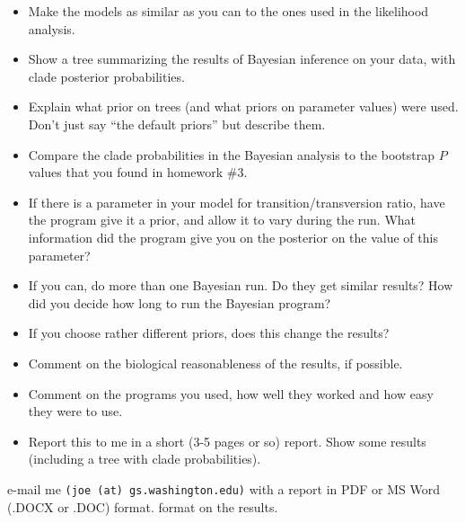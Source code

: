 \documentclass[12pt]{article}
\begin{document}
\begin{itemize}
\item Make the models as similar as you can to the ones used in the
likelihood analysis.
\item Show a tree summarizing the results of Bayesian inference on your
data, with clade posterior probabilities.
\item Explain what prior on trees (and what priors on parameter values)
were used.  Don't just say ``the default priors'' but describe them.
\item Compare the clade probabilities in the Bayesian analysis to the
bootstrap $P$ values that you found in homework \#3.
\item If there is a parameter in your model for transition/transversion
ratio, have the program give it a prior, and allow it to vary during the
run.  What information did the program give you on the posterior on
the value of this parameter?
\item If you can, do more than one Bayesian run.  Do they get similar
results?  How did you decide how long to run the Bayesian program?
\item If you choose rather different priors, does this change the results?
\item Comment on the biological reasonableness of the results, if possible.
\item Comment on the programs you used, how well they worked and how easy they
were to use.
\item Report this to me in a short (3-5 pages or so) report.  Show some
results (including a tree with clade probabilities).
\end{itemize}
\medskip

\noindent
e-mail me {\tt (joe (at) gs.washington.edu)} with a report in PDF or MS Word
(.DOCX or .DOC) format.
format on the results.

\vfill

\vfill
\end{document}
